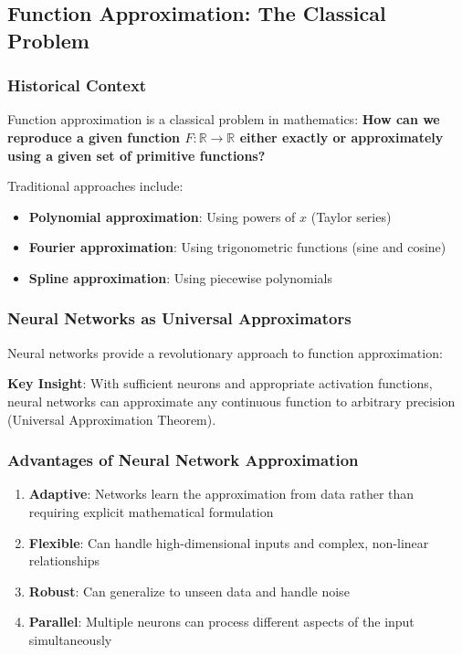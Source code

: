 \subsection{Function Approximation: The Classical Problem}

\subsubsection{Historical Context}
Function approximation is a classical problem in mathematics: \textbf{How can we reproduce a given function $F : \mathbb{R} \rightarrow \mathbb{R}$ either exactly or approximately using a given set of primitive functions?}

Traditional approaches include:
\begin{itemize}
    \item \textbf{Polynomial approximation}: Using powers of $x$ (Taylor series)
    \item \textbf{Fourier approximation}: Using trigonometric functions (sine and cosine)
    \item \textbf{Spline approximation}: Using piecewise polynomials
\end{itemize}

\subsubsection{Neural Networks as Universal Approximators}
Neural networks provide a revolutionary approach to function approximation:

\textbf{Key Insight}: With sufficient neurons and appropriate activation functions, neural networks can approximate any continuous function to arbitrary precision (Universal Approximation Theorem).

\subsubsection{Advantages of Neural Network Approximation}
\begin{enumerate}
    \item \textbf{Adaptive}: Networks learn the approximation from data rather than requiring explicit mathematical formulation
    \item \textbf{Flexible}: Can handle high-dimensional inputs and complex, non-linear relationships
    \item \textbf{Robust}: Can generalize to unseen data and handle noise
    \item \textbf{Parallel}: Multiple neurons can process different aspects of the input simultaneously
\end{enumerate}

